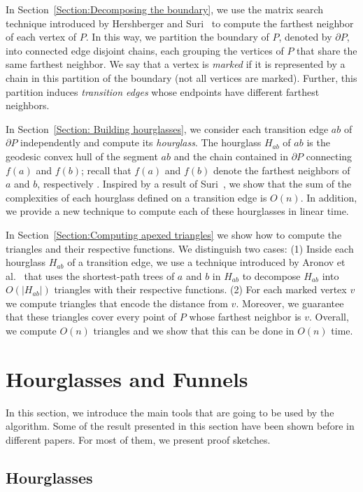 \documentclass[a4paper,UKenglish]{lipics}
\newcommand{\ff}[1]{\ensuremath{f(#1)}}
\begin{document}
In Section~\ref{Section:Decomposing the boundary}, we use the matrix search technique introduced by Hershberger and Suri~\cite{hershberger1993matrix} to compute the farthest neighbor of each vertex of $P$. 
In this way, we partition the boundary of $P$, denoted by $\partial P$, into connected edge disjoint chains,
each grouping the vertices of $P$ that share the same farthest neighbor. 
We say that a vertex is \emph{marked} if it is represented by a chain in this partition of the boundary (not all vertices are marked). 
Further, this partition induces \emph{transition edges} whose endpoints have different farthest neighbors. 

In Section~\ref{Section: Building hourglasses}, we consider each transition edge $ab$ of $\partial P$ independently and compute its \emph{hourglass}. The hourglass $H_{ab}$ of $ab$ is the geodesic convex hull of the segment $ab$ and the chain contained in $\partial P$ connecting $\ff{a}$ and $\ff{b}$; recall that $\ff{a}$ and $\ff{b}$ denote the farthest neighbors of $a$ and $b$, respectively . 
Inspired by a result of Suri~\cite{suri1989computing}, we show that the sum of the complexities of each hourglass defined on a transition edge is $O(n)$. 
In addition, we provide a new technique to compute each of these hourglasses in linear time.

In Section~\ref{Section:Computing apexed triangles} we show how to compute the triangles and their respective functions.
We distinguish two cases: (1) Inside each hourglass $H_{ab}$ of a transition edge, we use a technique introduced by Aronov et al.~\cite{aronov1993furthest} that uses the shortest-path trees of $a$ and $b$ in $H_{ab}$ to decompose $H_{ab}$ into $O(|H_{ab}|)$ triangles with their respective functions. 
(2) For each marked vertex $v$ we compute triangles that encode the distance from $v$. Moreover, we guarantee that these triangles cover every point of $P$ whose farthest neighbor is $v$. Overall, we compute $O(n)$ triangles and we show that this can be done in $O(n)$ time.

\section{Hourglasses and Funnels}
In this section, we introduce the main tools that are going to be used by the algorithm. Some of the result presented in this section have been shown before in different papers. For most of them, we present proof sketches.

\subsection{Hourglasses}
\end{document}
